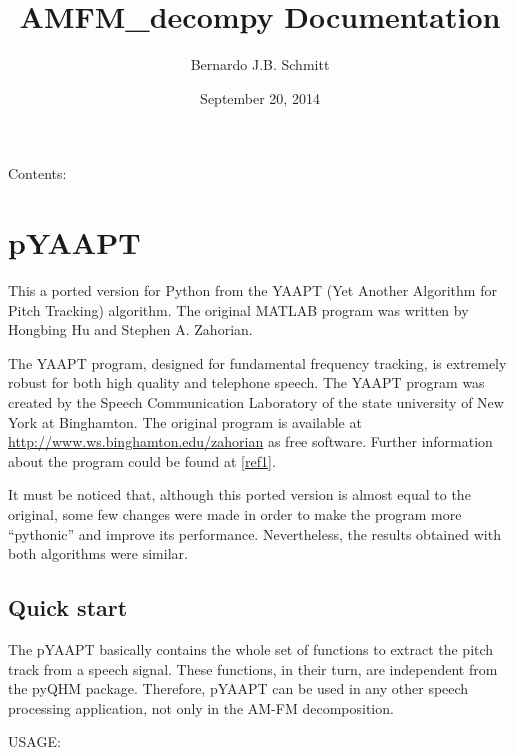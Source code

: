 \documentclass[letterpaper,10pt,english]{sphinxmanual}
\title{AMFM\_decompy Documentation}
\date{September 20, 2014}
\author{Bernardo J.B. Schmitt}
\begin{document}
\maketitle
\tableofcontents
{}\label{index::doc}


Contents:


\chapter{pYAAPT}
\label{pYAAPT:welcome-to-amfm-decompy-s-documentation}\label{pYAAPT::doc}\label{pYAAPT:pyaapt}
This a ported version for Python from the YAAPT (Yet Another Algorithm for Pitch Tracking) algorithm. The original MATLAB program was written by Hongbing Hu and Stephen A. Zahorian.

The YAAPT program, designed for fundamental frequency tracking, is extremely robust for both high quality and telephone speech. The YAAPT program was created by the Speech Communication Laboratory of the state university of New York at Binghamton. The original program is available at \href{http://www.ws.binghamton.edu/zahorian}{http://www.ws.binghamton.edu/zahorian} as free software. Further information about the program could be found at {\hyperref[pYAAPT:ref1]{{[}ref1{]}}}.

It must be noticed that, although this ported version is almost equal to the original, some few changes were made in order to make the program more ``pythonic'' and improve its performance. Nevertheless, the results obtained with both algorithms were similar.


\section{Quick start}
\label{pYAAPT:quick-start}
The pYAAPT basically contains the whole set of functions to extract the pitch track from a speech signal. These functions, in their turn, are independent from the pyQHM package. Therefore, pYAAPT can be used in any other speech processing application, not only in the AM-FM decomposition.

USAGE:
\end{document}
